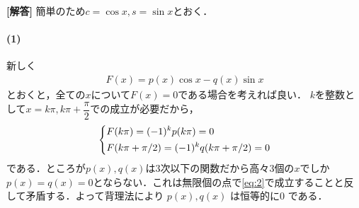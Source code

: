\documentclass[../../main.tex]{subfiles}
\begin{document}
\begin{oframed}
  
\end{oframed}

{\bf [解答]}
簡単のため$c=\cos x, s=\sin x$とおく．

\paragraph{(1)}
新しく
\begin{align}
  F(x)=p(x)\cos x-q(x)\sin x \label{eq:1}
\end{align}
とおくと，全ての$x$について$F(x)=0$である場合を考えれば良い．
$k$を整数として$x=k\pi, k\pi+\dfrac{\pi}{2}$での成立が必要だから，
\begin{align}
  \begin{dcases}
    F(k\pi) = (-1)^{k}p(k\pi) = 0 \\
    F(k\pi+\pi/2) = (-1)^{k}q(k\pi+\pi/2) = 0
  \end{dcases} \label{eq:2}
\end{align}
である．ところが$p(x), q(x)$は$3$次以下の関数だから高々$3$個の$x$でしか$p(x)=q(x)=0$とならない．これは無限個の点で\cref{eq:2}で成立することと反して矛盾する．よって背理法により $p(x), q(x)$ は恒等的に$0$ である．
\end{document}

